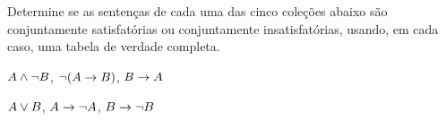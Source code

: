 \problempart
\label{pr.TT.satisfiable2}
Determine se as sentenças de cada uma das cinco coleções abaixo são conjuntamente satisfatórias ou conjuntamente insatisfatórias, usando, em cada caso, uma tabela de verdade completa.
\begin{earg}
\item $A \wedge \neg B$, $\neg(A \rightarrow B)$, $B \rightarrow A$\vspace{.5ex} %


\item $A \vee B$, $A \rightarrow \neg A$, $B \rightarrow \neg B$ \vspace{.5ex}%



\end{earg}
